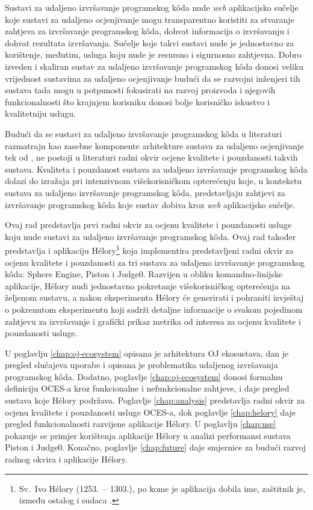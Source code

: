 \documentclass[times, utf8, diplomski]{fer}
\begin{document}
Sustavi za udaljeno izvršavanje programskog kôda nude \textit{web} aplikacijsko sučelje koje sustavi za udaljeno ocjenjivanje mogu transparentno koristiti za stvaranje zahtjeva za izvršavanje programskog kôda, dohvat informacija o izvršavanju i dohvat rezultata izvršavanja. Sučelje koje takvi sustavi nude je jednostavno za korištenje, međutim, usluga koju nude je resursno i sigurnosno zahtjevna. Dobro izveden i skaliran sustav za udaljeno izvršavanje programskog kôda donosi veliku vrijednost sustavima za udaljeno ocjenjivanje budući da se razvojni inženjeri tih sustava tada mogu u potpunosti fokusirati na razvoj proizvoda i njegovih funkcionalnosti što krajnjem korisniku donosi bolje korisničko iskustvo i kvalitetniju uslugu.

Budući da se sustavi za udaljeno izvršavanje programskog kôda u literaturi razmatraju kao zasebne komponente arhitekture sustava za udaljeno ocjenjivanje tek od \citep{9245310}, ne postoji u literaturi radni okvir ocjene kvalitete i pouzdanosti takvih sustava. Kvaliteta i pouzdanost sustava za udaljeno izvršavanje programskog kôda dolazi do izražaja pri intenzivnom višekorisničkom opterećenju koje, u kontekstu sustava za udaljeno izvršavanje programskog kôda, predstavljaju zahtjevi za izvršavanje programskog kôda koje sustav dobiva kroz \textit{web} aplikacijsko sučelje.

Ovaj rad predstavlja prvi radni okvir za ocjenu kvalitete i pouzdanosti usluge koju nude sustavi za udaljeno izvršavanje programskog kôda. Ovaj rad također predstavlja i aplikaciju Hélory\footnote{Sv.\ Ivo Hélory (1253.\ -- 1303.), po kome je aplikacija dobila ime, zaštitnik je, između ostalog i sudaca .} koja implementira predstavljeni radni okvir za ocjenu kvalitete i pouzdanosti za tri sustava za udaljeno izvršavanje programskog kôda: Sphere Engine, Piston i Judge0. Razvijen u obliku komandno-linijske aplikacije, Hélory nudi jednostavno pokretanje višekorisničkog opterećenja na željenom sustavu, a nakon eksperimenta Hélory će generirati i pohraniti izvještaj o pokrenutom eksperimentu koji sadrži detaljne informacije o svakom pojedinom zahtjevu za izvršavanje i grafički prikaz metrika od interesa za ocjenu kvalitete i pouzdanosti usluge.

U poglavlju \ref{chap:oj-ecosystem} opisana je arhitektura OJ ekosustava, dan je pregled slučajeva uporabe  i opisana je problematika udaljenog izvršavanja programskog kôda. Dodatno, poglavlje \ref{chap:oj-ecosystem} donosi formalnu definiciju OCES-a kroz funkcionalne i nefunkcionalne zahtjeve, i daje pregled sustava koje Hélory podržava. Poglavlje \ref{chap:analysis} predstavlja radni okvir za ocjenu kvalitete i pouzdanosti usluge OCES-a, dok poglavlje \ref{chap:helory} daje pregled funkcionalnosti razvijene aplikacije Hélory. U poglavlju \ref{chap:use} pokazuje se primjer korištenja aplikacije Hélory u analizi performansi sustava Piston i Judge0. Konačno, poglavlje \ref{chap:future} daje smjernice za budući razvoj radnog okvira i aplikacije Hélory.
\end{document}
